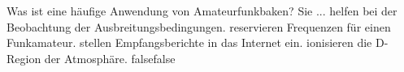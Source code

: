     {Was ist eine häufige Anwendung von Amateurfunkbaken? Sie ...}
    {helfen bei der Beobachtung der Ausbreitungsbedingungen.}
    {reservieren Frequenzen für einen Funkamateur.}
    {stellen Empfangsberichte in das Internet ein.}
    {ionisieren die D-Region der Atmosphäre.}
    {false}{false}